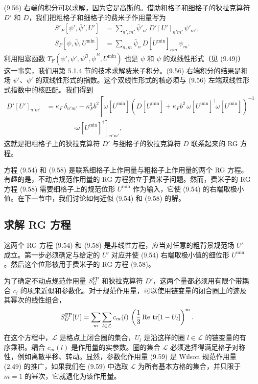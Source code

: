 (9.56) 右端的积分可以求解，因为它是高斯的。借助粗格子和细格子的狄拉克算符 $D'$ 和 $D$，我们把粗格子和细格子的费米子作用量写为
\begin{align}
  S'_F[\psi',\bar\psi',U'] &= \sum_{n',m'}\bar\psi'_{n'}\,D'[U']_{n'm'}\,\psi'_{m'} , \nonumber\\
  S_F[\psi,\bar\psi,U^{\min}] &= \sum_{n,m}\bar\psi_n\,D[U^{\min}]_{nm}\,\psi_m .
\end{align}
利用阻塞函数 $T_F(\psi',\bar\psi',\psi^B,\bar\psi^B, U^{\min})$ 也是 $\psi$ 和 $\bar\psi$ 的双线性形式（见 (9.49)）这一事实，我们用第 5.1.4 节的技术求解费米子积分。(9.56) 右端积分的结果是粗场 $\psi'$、$\bar\psi'$ 的双线性形式的指数。这个双线性形式的核必须与 (9.56) 左端双线性形式指数中的核匹配。我们得到
\begin{equation}
  \begin{split}
    D'[U']_{n'm'}
    &= \kappa_F\,\delta_{n'm'}
       - \kappa_F^2 b^2\left[\omega[U^{\min}]
         \left(D[U^{\min}] + \kappa_F b^2\,\omega[U^{\min}]^\dagger
         \omega[U^{\min}]\right)^{-1}\right. \\
    &\qquad\qquad \left.\cdot \omega[U^{\min}]^\dagger\right]_{n'm'} ,
  \end{split}
\end{equation}
这就是把粗格子上的狄拉克算符 $D'$ 与细格子的狄拉克算符 $D$ 联系起来的 RG 方程。

方程 (9.54) 和 (9.58) 是联系细格子上作用量与粗格子上作用量的两个 RG 方程。有趣的是，不动点规范作用量的 RG 方程独立于费米子问题。然而，费米子的 RG 方程 (9.58) 需要细格子上的规范位形 $U^{\min}$ 作为输入，它使 (9.54) 的右端取极小值。在下一节中，我们讨论如何近似 (9.54) 和 (9.58) 的解。

\subsection{求解 RG 方程}
\label{sec:9.3.4}

这两个 RG 方程 (9.54) 和 (9.58) 是非线性方程，应当对任意的粗背景规范场 $U'$ 成立。第一步必须确定与给定的 $U'$ 对应并使 (9.54) 右端取极小值的细位形 $U^{\min}$。然后这个位形被用于费米子的 RG 方程 (9.58)。

为了确定不动点规范作用量 $S^{\mathrm{FP}}_G$ 和狄拉克算符 $D'$，这两个量都必须用有限个带耦合 $c_i$ 的项来近似和参数化。对于规范作用量，可以使用链变量的闭合圈上的迹及其幂次的线性组合，
\begin{equation}
  S^{\mathrm{FP}}_G[U] = \sum_m\sum_{l\in\mathcal{L}}c_m(l)\,
    \left(\frac{1}{3}\,\mathrm{Re}\,\operatorname{tr}[1-U_l]\right)^m .
\end{equation}
在这个方程中，$\mathcal{L}$ 是格点上闭合圈的集合，$U_l$ 是沿这样的圈 $l \in \mathcal{L}$ 的链变量的有序乘积。耦合 $c_m(l)$ 是作用量的实参数。圈的集合 $\mathcal{L}$ 必须选择得满足格子对称性，例如离散平移、转动。显然，参数化作用量 (9.59) 是 Wilson 规范作用量 (2.49) 的推广，如果我们在 (9.59) 中选取 $\mathcal{L}$ 为所有基本方格的集合，并只限于 $m = 1$ 的幂次，它就退化为该作用量。

